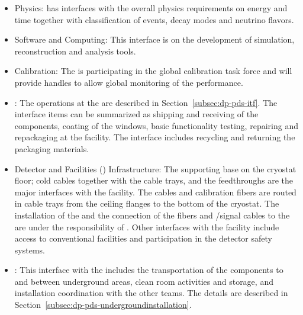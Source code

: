 \begin{itemize}
\item \dune Physics: \dual {} has interfaces with the overall physics requirements on energy and time together with classification of events, decay modes and neutrino flavors.

\item Software and Computing: This interface is on the development of simulation, reconstruction and analysis tools.

\item Calibration: The  is participating in the  global calibration task force and will provide handles to allow global monitoring of the  performance.

\item {}: The operations at the  are described in Section~\ref{subsec:dp-pds-itf}. The interface items can be summarized as shipping and receiving of the  components,  coating of the  windows, basic functionality testing, repairing and repackaging at the facility. The interface includes recycling and returning the packaging materials.

\item Detector and Facilities () Infrastructure: The 
 supporting base on the cryostat floor; cold cables together with the cable trays, and the feedthroughs are the major interfaces with the facility. The cables and calibration fibers are routed in cable trays from the ceiling \fdth flanges to the bottom of the cryostat. The installation of the  and the connection of the fibers and /signal cables to the  are under the responsibility of . Other interfaces with the facility include access to conventional facilities and participation in the detector safety systems. 

\item {}: This interface with the  includes the transportation of the  components to and between underground areas, clean room activities and storage, and installation coordination with the other teams. The details are described in Section~\ref{subsec:dp-pds-undergroundinstallation}.

\end{itemize}

